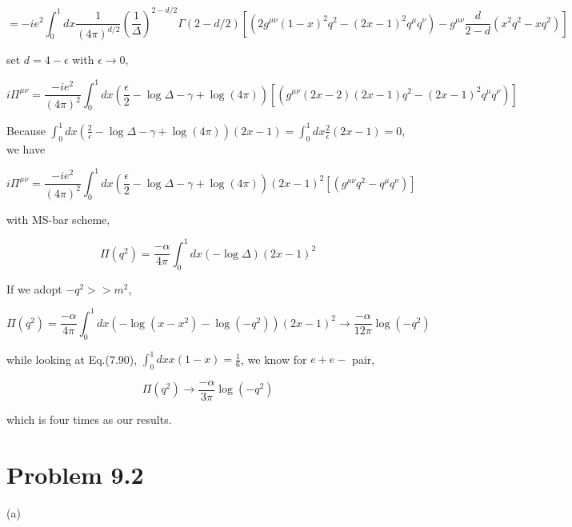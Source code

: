\documentclass[prd,aps,nofootinbib,floatfix,10pt]{revtex4}
\begin{document}
\[ = -i e^2 \int_0^1 dx \frac{1}{(4\pi)^{d/2}} (\frac{1}{\Delta})^{2-d/2} \Gamma(2-d/2) [ (2 g^{\mu \nu} (1-x)^2 q^2 - (2x-1)^2 q^\mu q^\nu) - g^{\mu \nu} \frac{d}{2-d} (x^2 q^2 - x q^2) ] \]

set $d = 4-\epsilon$ with $\epsilon \to 0$,

\[ i \Pi^{\mu \nu} = \frac{-i e^2}{(4\pi)^{2}} \int_0^1 dx  (\frac{\epsilon}{2} -\log\Delta - \gamma + \log(4\pi)) [ (g^{\mu \nu} (2x-2)(2x-1) q^2 - (2x-1)^2 q^\mu q^\nu) ] \]

Because $\int_0^1 dx  (\frac{2}{\epsilon} -\log\Delta - \gamma + \log(4\pi)) (2x-1) = \int_0^1 dx  \frac{2}{\epsilon} (2x-1) = 0$, we have

\[ i \Pi^{\mu \nu} = \frac{-i e^2}{(4\pi)^{2}} \int_0^1 dx  (\frac{\epsilon}{2} -\log\Delta - \gamma + \log(4\pi)) (2x-1)^2 [ (g^{\mu \nu} q^2 - q^\mu q^\nu) ] \]

with MS-bar scheme,

\[ \Pi(q^2) = \frac{-\alpha}{4\pi} \int_0^1 dx  (-\log\Delta ) (2x-1)^2 \]

If we adopt $-q^2 >> m^2$, 

\[ \Pi(q^2) = \frac{-\alpha}{4\pi} \int_0^1 dx  (-\log(x - x^2) - \log(-q^2) ) (2x-1)^2  \to \frac{-\alpha}{12 \pi} \log(-q^2)\]

while looking at Eq.(7.90), $\int_0^1 dx x(1-x) = \frac{1}{6}$, we know for $e+e-$ pair,

\[ \Pi(q^2) \to \frac{-\alpha}{3 \pi} \log(-q^2) \]

which is four times as our results.


\section{Problem 9.2}

\noindent (a)






\begin{thebibliography}{1}
	
\end{thebibliography}
\end{document}
